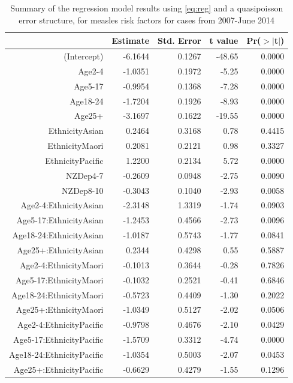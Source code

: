 \documentclass{article}
\begin{document}
\vspace{5mm} %
\begin{table}
\begin{tabular}{rrrrr}
  \hline
 & Estimate & Std. Error & t value & Pr($>$$|$t$|$) \\ 
  \hline
(Intercept) & -6.1644 & 0.1267 & -48.65 & 0.0000 \\ 
  Age2-4 & -1.0351 & 0.1972 & -5.25 & 0.0000 \\ 
  Age5-17 & -0.9954 & 0.1368 & -7.28 & 0.0000 \\ 
  Age18-24 & -1.7204 & 0.1926 & -8.93 & 0.0000 \\ 
  Age25+ & -3.1697 & 0.1622 & -19.55 & 0.0000 \\ 
  EthnicityAsian & 0.2464 & 0.3168 & 0.78 & 0.4415 \\ 
  EthnicityMaori & 0.2081 & 0.2121 & 0.98 & 0.3327 \\ 
  EthnicityPacific & 1.2200 & 0.2134 & 5.72 & 0.0000 \\ 
  NZDep4-7 & -0.2609 & 0.0948 & -2.75 & 0.0090 \\ 
  NZDep8-10 & -0.3043 & 0.1040 & -2.93 & 0.0058 \\ 
  Age2-4:EthnicityAsian & -2.3148 & 1.3319 & -1.74 & 0.0903 \\ 
  Age5-17:EthnicityAsian & -1.2453 & 0.4566 & -2.73 & 0.0096 \\ 
  Age18-24:EthnicityAsian & -1.0187 & 0.5743 & -1.77 & 0.0841 \\ 
  Age25+:EthnicityAsian & 0.2344 & 0.4298 & 0.55 & 0.5887 \\ 
  Age2-4:EthnicityMaori & -0.1013 & 0.3644 & -0.28 & 0.7826 \\ 
  Age5-17:EthnicityMaori & -0.1032 & 0.2521 & -0.41 & 0.6846 \\ 
  Age18-24:EthnicityMaori & -0.5723 & 0.4409 & -1.30 & 0.2022 \\ 
  Age25+:EthnicityMaori & -1.0349 & 0.5127 & -2.02 & 0.0506 \\ 
  Age2-4:EthnicityPacific & -0.9798 & 0.4676 & -2.10 & 0.0429 \\ 
  Age5-17:EthnicityPacific & -1.5709 & 0.3312 & -4.74 & 0.0000 \\ 
  Age18-24:EthnicityPacific & -1.0354 & 0.5003 & -2.07 & 0.0453 \\ 
  Age25+:EthnicityPacific & -0.6629 & 0.4279 & -1.55 & 0.1296 \\ 
   \hline
\end{tabular}\caption{Summary of the regression model results using \autoref{eq:reg} and a quasipoisson error structure, for measles risk factors for cases from 2007-June 2014}
\label{table:regression_riskfactors}
\end{table}
\end{document}
